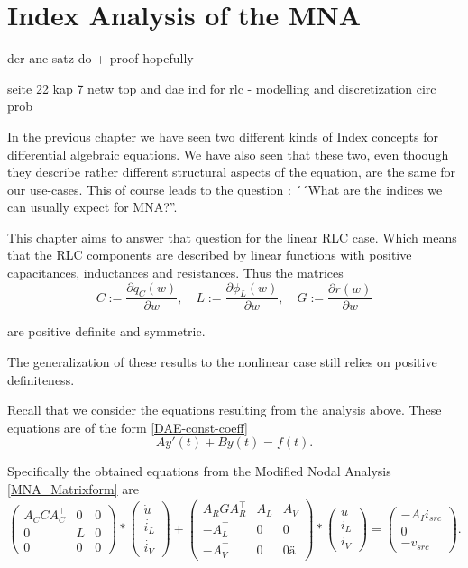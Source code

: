 \chapter{Index Analysis of the MNA}

der ane satz do + proof hopefully

seite 22 kap 7 netw top and dae ind for rlc - modelling and discretization circ prob

In the previous chapter we have seen two different kinds of Index concepts for differential algebraic equations. We have also seen that these two, even thoough they describe rather different structural aspects of the equation, are the same for our use-cases. This of course leads to the question : ´´What are the indices we can usually expect for MNA?''.

This chapter aims to answer that question for the linear RLC case. Which means that the RLC components are described by linear functions with positive capacitances, inductances and resistances. Thus the matrices
\begin{displaymath}
	C:=\frac{\partial q_C(w)}{\partial w}, \quad L:=\frac{\partial \phi_L(w)}{\partial w}, \quad G:=\frac{\partial r(w)}{\partial w}
\end{displaymath}

are positive definite and symmetric.

The generalization of these results to the nonlinear case still relies on positive definiteness.

Recall that we consider the equations resulting from the analysis above. These equations are of the form \ref{DAE-const-coeff}
\begin{displaymath}
	A y'(t) + B y(t) = f(t).
\end{displaymath}

Specifically the obtained equations from the Modified Nodal Analysis \ref{MNA_Matrixform} are
\begin{displaymath}
	\begin{pmatrix}
		A_C C A_C^\top & 0 & 0 \\
		0 & L & 0 \\
		0 & 0 & 0
	\end{pmatrix}
	*
	\begin{pmatrix}
		\dot{u} \\
		\dot{i_L} \\
		\dot{i_V}
	\end{pmatrix}
	+
	\begin{pmatrix}
		A_R G A_R^\top & A_L & A_V \\
		-A_L^\top & 0 & 0 \\
		-A_V^\top & 0 & 0 ä
	\end{pmatrix}
	*
	\begin{pmatrix}
		u \\
		i_L \\
		i_V
	\end{pmatrix}
	=
	\begin{pmatrix}
		-A_I i_{src} \\
		0 \\
		-v_{src}
	\end{pmatrix}.
\end{displaymath}

